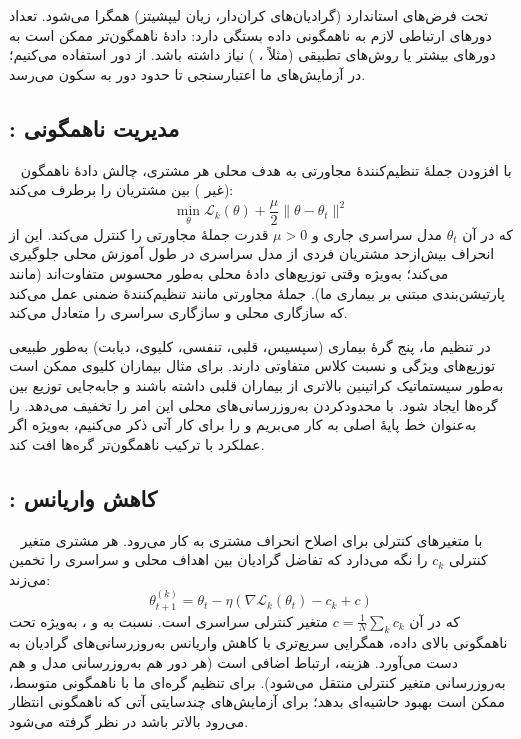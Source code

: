  تحت فرض‌های استاندارد (گرادیان‌های کران‌دار، زیان لیپشیتز) همگرا می‌شود. تعداد دورهای ارتباطی لازم به ناهمگونی داده بستگی دارد: دادۀ ناهمگون‌تر ممکن است به دورهای بیشتر یا روش‌های تطبیقی (مثلاً ، ) نیاز داشته باشد. از  دور استفاده می‌کنیم؛ در آزمایش‌های ما  اعتبارسنجی تا حدود دور  به سکون می‌رسد.

\subsection{: مدیریت ناهمگونی}

~\cite{li2020federated} با افزودن جملۀ تنظیم‌کنندۀ مجاورتی به هدف محلی هر مشتری، چالش دادۀ ناهمگون (غیر ) بین مشتریان را برطرف می‌کند:
\begin{equation}
\min_\theta \mathcal{L}_k(\theta) + \frac{\mu}{2} \|\theta - \theta_t\|^2
\end{equation}
که در آن $\theta_t$ مدل سراسری جاری و $\mu > 0$ قدرت جملۀ مجاورتی را کنترل می‌کند. این از انحراف بیش‌ازحد مشتریان فردی از مدل سراسری در طول آموزش محلی جلوگیری می‌کند؛ به‌ویژه وقتی توزیع‌های دادۀ محلی به‌طور محسوس متفاوت‌اند (مانند پارتیشن‌بندی مبتنی بر بیماری ما). جملۀ مجاورتی مانند تنظیم‌کنندۀ ضمنی عمل می‌کند که سازگاری محلی و سازگاری سراسری را متعادل می‌کند.

در تنظیم ما، پنج گرۀ بیماری (سپسیس، قلبی، تنفسی، کلیوی، دیابت) به‌طور طبیعی توزیع‌های ویژگی و نسبت کلاس متفاوتی دارند. برای مثال بیماران کلیوی ممکن است به‌طور سیستماتیک کراتینین بالاتری از بیماران قلبی داشته باشند و جابه‌جایی توزیع بین گره‌ها ایجاد شود.  با محدودکردن به‌روزرسانی‌های محلی این امر را تخفیف می‌دهد.  را به‌عنوان خط پایۀ اصلی به کار می‌بریم و  را برای کار آتی ذکر می‌کنیم، به‌ویژه اگر عملکرد با ترکیب ناهمگون‌تر گره‌ها افت کند.

\subsection{: کاهش واریانس}

~\cite{karimireddy2020scaffold} با متغیرهای کنترلی برای اصلاح انحراف مشتری به کار می‌رود. هر مشتری متغیر کنترلی $c_k$ را نگه می‌دارد که تفاضل گرادیان بین اهداف محلی و سراسری را تخمین می‌زند:
\begin{equation}
\theta_{t+1}^{(k)} = \theta_t - \eta (\nabla \mathcal{L}_k(\theta_t) - c_k + c)
\end{equation}
که در آن $c = \frac{1}{N}\sum_k c_k$ متغیر کنترلی سراسری است.  نسبت به  و ، به‌ویژه تحت ناهمگونی بالای داده، همگرایی سریع‌تری با کاهش واریانس به‌روزرسانی‌های گرادیان به دست می‌آورد. هزینه، ارتباط اضافی است (هر دور هم به‌روزرسانی مدل و هم به‌روزرسانی متغیر کنترلی منتقل می‌شود). برای تنظیم  گره‌ای ما با ناهمگونی متوسط،  ممکن است بهبود حاشیه‌ای بدهد؛ برای آزمایش‌های چندسایتی آتی که ناهمگونی انتظار می‌رود بالاتر باشد در نظر گرفته می‌شود.

